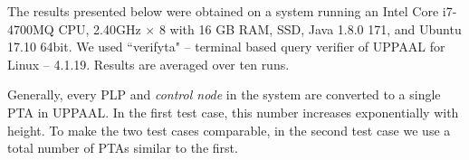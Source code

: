 \documentclass[letterpaper]{article}
\begin{document}
The results presented below were obtained on a system running an Intel Core i7-4700MQ CPU, 2.40GHz $\times$ 8 with 16 GB RAM, SSD, Java 1.8.0 171, and Ubuntu 17.10 64bit. We used
``verifyta" -- terminal based query verifier of UPPAAL for Linux -- 4.1.19. Results are averaged over ten runs.

Generally, every PLP and {\em control node} in the system are converted to a single PTA in UPPAAL. In the first test case, this number increases exponentially with height.  To make the two test cases comparable, in the second test case we use a total number of PTAs similar to the first.






\end{document}
